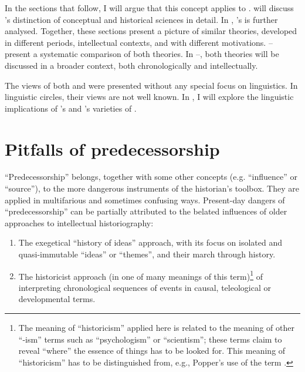 \documentclass[output=paper]{langscibook}
\begin{document}
In the sections that follow, I will argue that this concept applies to {\Sapir}.  will discuss {\Sapir}'s distinction of conceptual and historical sciences in detail. In , {\Fodor}'s  is further analysed. Together, these sections present a picture of similar theories, developed in different periods, intellectual contexts, and with different motivations. -- present a systematic comparison of both theories. In --, both theories will be discussed in a broader context, both chronologically and intellectually. 

The views of both {\Sapir} and {\Fodor} were presented without any special focus on linguistics. In linguistic circles, their views are not well known. In , I will explore the linguistic implications of {\Sapir}'s and {\Fodor}'s varieties of .

\section{Pitfalls of predecessorship}
\label{sec:elffers:pitfalls}

``Predecessorship'' belongs, together with some other concepts (e.g. ``influence'' or ``source''), to the more dangerous instruments of the historian's toolbox. They are applied in multifarious and sometimes confusing ways. Present-day dangers of ``predecessorship'' can be partially attributed to the belated influences of older approaches to intellectual historiography:

\begin{enumerate}
    \item The exegetical ``history of ideas'' approach, with its focus on isolated and quasi-immutable ``ideas'' or ``themes'', and their march through history.
    \item The historicist approach (in one of many meanings of this term)\footnote{The meaning of ``historicism'' applied here is related to the meaning of other ``-ism'' terms such as ``psychologism'' or ``scientism''; these terms claim to reveal ``where'' the essence of things has to be looked for. This meaning of ``historicism'' has to be distinguished from, e.g., Popper's use of the term \citep[cf.][43]{Elffers1991}.} of interpreting chronological sequences of events in causal, teleological or developmental terms.
\end{enumerate}
\end{document}
